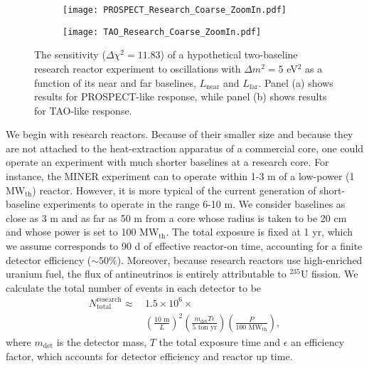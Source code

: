 \documentclass[prd, twocolumn, tightenlines, twoside, secnumarabic, superscriptaddress, preprintnumbers, nofootinbib, notitlepage]{revtex4-1}
\begin{document}
\begin{figure*}
\begin{subfigure}[t]{0.45\textwidth}
    \centering
    \texttt{[image: PROSPECT\_Research\_Coarse\_ZoomIn.pdf]}
    \caption{}
    \label{fig:prospect_research}
\end{subfigure}
%
\hspace{5mm}
%
\begin{subfigure}[t]{0.45\textwidth}
\centering
    \texttt{[image: TAO\_Research\_Coarse\_ZoomIn.pdf]}
    \caption{}
    \label{fig:tao_research}
\end{subfigure}
\caption{The sensitivity ($\Delta \chi^2 = 11.83$) of a hypothetical two-baseline research reactor experiment to oscillations with $\Delta m^2 = 5$ eV$^2$ as a function of its near and far baselines, $L_\text{near}$ and $L_\text{far}$. Panel (a) shows results for PROSPECT-like response, while panel (b) shows results for TAO-like response.}
\end{figure*}

We begin with research reactors. Because of their smaller size and because they are not attached to the heat-extraction apparatus of a commercial core, one could operate an experiment with much shorter baselines at a research core. For instance, the MINER experiment \cite{Agnolet:2016zir} can to operate within 1-3 m of a low-power (1 MW$_\text{th}$) reactor. However, it is more typical of the current generation of short-baseline experiments to operate in the range 6-10 m. We consider baselines as close as 3 m and as far as 50 m from a core whose radius is taken to be 20 cm and whose power is set to 100 MW$_\text{th}$. The total exposure is fixed at 1 yr, which we assume corresponds to 90 d of effective reactor-on time, accounting for a finite detector efficiency ($\sim50\%$). Moreover, because research reactors use high-enriched uranium fuel, the flux of antineutrinos is entirely attributable to $^{235}$U fission. We calculate the total number of events in each detector to be
\begin{align}
    N_\text{total}^\text{research} \approx \, & 1.5 \times 10^{6} \times \\
    & \left( \frac{\text{10 m}}{L} \right)^2 \left( \frac{m_\text{det} T \epsilon}{\text{5 ton yr}} \right) \left( \frac{P}{\text{100 MW}_{\text{th}}} \right), \nonumber
\end{align}
where $m_\text{det}$ is the detector mass, $T$ the total exposure time and $\epsilon$ an efficiency factor, which accounts for detector efficiency and reactor up time.
\end{document}
